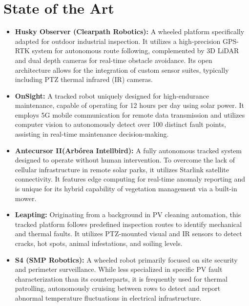 \chapter{State of the Art}

\begin{itemize}
    \item \textbf{Husky Observer (Clearpath Robotics):} A wheeled platform specifically adapted for outdoor industrial inspection.
    It utilizes a high-precision GPS-RTK system for autonomous route following, complemented by 3D LiDAR and dual depth cameras for real-time obstacle avoidance.
    Its open architecture allows for the integration of custom sensor suites, typically including PTZ thermal infrared (IR) cameras.
    
    \item \textbf{OnSight:} A tracked robot uniquely designed for high-endurance maintenance, capable of operating for 12 hours per day using solar power. 
    It employs 5G mobile communication for remote data transmission and utilizes computer vision to autonomously detect over 100 distinct fault points, assisting in real-time maintenance decision-making.
    
    \item \textbf{Antecursor II(Arbórea Intellbird):} A fully autonomous tracked system designed to operate without human intervention. 
    To overcome the lack of cellular infrastructure in remote solar parks, it utilizes Starlink satellite connectivity. 
    It features edge computing for real-time anomaly reporting and is unique for its hybrid capability of vegetation management via a built-in mower.
    
    \item \textbf{Leapting:} Originating from a background in PV cleaning automation, this tracked platform follows predefined inspection routes to identify mechanical and thermal faults. 
    It utilizes PTZ-mounted visual and IR sensors to detect cracks, hot spots, animal infestations, and soiling levels.
    
    \item \textbf{S4 (SMP Robotics):} A wheeled robot primarily focused on site security and perimeter surveillance. 
    While less specialized in specific PV fault characterization than its counterparts, it is frequently used for thermal patrolling, autonomously cruising between rows to detect and report abnormal temperature fluctuations in electrical infrastructure.


\end{itemize}
